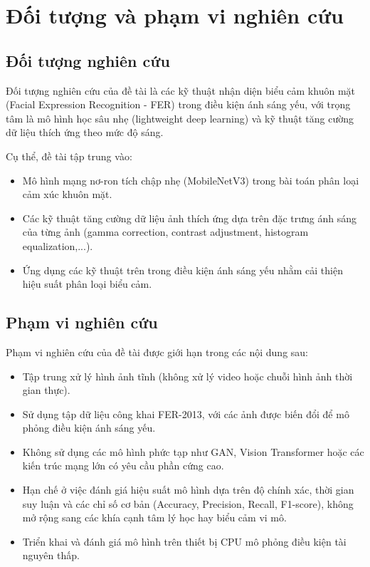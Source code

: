 \section{Đối tượng và phạm vi nghiên cứu} %

\subsection{Đối tượng nghiên cứu}

Đối tượng nghiên cứu của đề tài là các kỹ thuật nhận diện biểu cảm khuôn mặt (Facial Expression Recognition - FER) trong điều kiện ánh sáng yếu, với trọng tâm là mô hình học sâu nhẹ (lightweight deep learning) và kỹ thuật tăng cường dữ liệu thích ứng theo mức độ sáng.

Cụ thể, đề tài tập trung vào:

\begin{itemize}
    \item Mô hình mạng nơ-ron tích chập nhẹ (MobileNetV3) trong bài toán phân loại cảm xúc khuôn mặt.
    \item Các kỹ thuật tăng cường dữ liệu ảnh thích ứng dựa trên đặc trưng ánh sáng của từng ảnh (gamma correction, contrast adjustment, histogram equalization,...).
    \item Ứng dụng các kỹ thuật trên trong điều kiện ánh sáng yếu nhằm cải thiện hiệu suất phân loại biểu cảm.
\end{itemize}

\subsection{Phạm vi nghiên cứu}

Phạm vi nghiên cứu của đề tài được giới hạn trong các nội dung sau:

\begin{itemize}
    \item Tập trung xử lý hình ảnh tĩnh (không xử lý video hoặc chuỗi hình ảnh thời gian thực).
    \item Sử dụng tập dữ liệu công khai FER-2013, với các ảnh được biến đổi để mô phỏng điều kiện ánh sáng yếu.
    \item Không sử dụng các mô hình phức tạp như GAN, Vision Transformer hoặc các kiến trúc mạng lớn có yêu cầu phần cứng cao.
    \item Hạn chế ở việc đánh giá hiệu suất mô hình dựa trên độ chính xác, thời gian suy luận và các chỉ số cơ bản (Accuracy, Precision, Recall, F1-score), không mở rộng sang các khía cạnh tâm lý học hay biểu cảm vi mô.
    \item Triển khai và đánh giá mô hình trên thiết bị CPU mô phỏng điều kiện tài nguyên thấp.
\end{itemize}